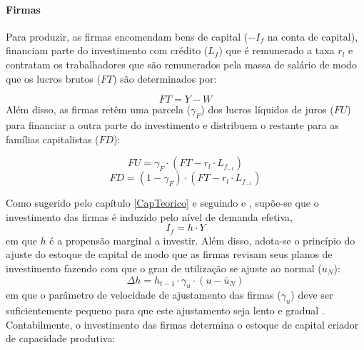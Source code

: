 \paragraph*{Firmas} Para produzir, as firmas encomendam bens de capital ($-I_f$ na conta de capital), financiam parte do investimento com crédito ($L_f$) que é remunerado a taxa $r_l$ e contratam os trabalhadores que são remunerados pela massa de salário de modo que os lucros brutos ($FT$) são determinados por:

\begin{equation}
    FT = Y - W
\end{equation}
Além disso, as firmas retêm uma parcela ($\gamma_F$) dos lucros líquidos de juros ($FU$) para financiar a outra parte do investimento e distribuem o restante para as famílias capitalistas ($FD$):

\begin{equation}
    FU = \gamma_F\cdot (FT - r_l\cdot L_{f_{-1}})
\end{equation}
\begin{equation}
    FD = (1-\gamma_F)\cdot (FT - r_l\cdot L_{f_{-1}})
\end{equation}

Como sugerido pelo capítulo \ref{CapTeorico} e seguindo \textcite{serrano_long_1995} e \textcite{serrano_sraffian_2017}, supõe-se que o investimento das firmas é induzido pelo nível de demanda efetiva,
\begin{equation}
\label{_If}
    I_f = h\cdot Y
\end{equation}
em que $h$ é a propensão marginal a investir. Além disso, adota-se o princípio do ajuste do estoque de capital de modo que as firmas revisam seus planos de investimento fazendo com que o grau de utilização se ajuste ao normal ($u_N$):
\begin{equation}
\label{_h}
    \Delta h = h_{t-1}\cdot \gamma_u\cdot (u - \overline{u}_N)
\end{equation}
em que o parâmetro de velocidade de ajustamento das firmas ($\gamma_u$) deve ser suficientemente pequeno para que este ajustamento seja lento e gradual \cite[p.~271]{freitas_growth_2015}. Contabilmente, o investimento das firmas determina o estoque de capital criador de capacidade produtiva:

